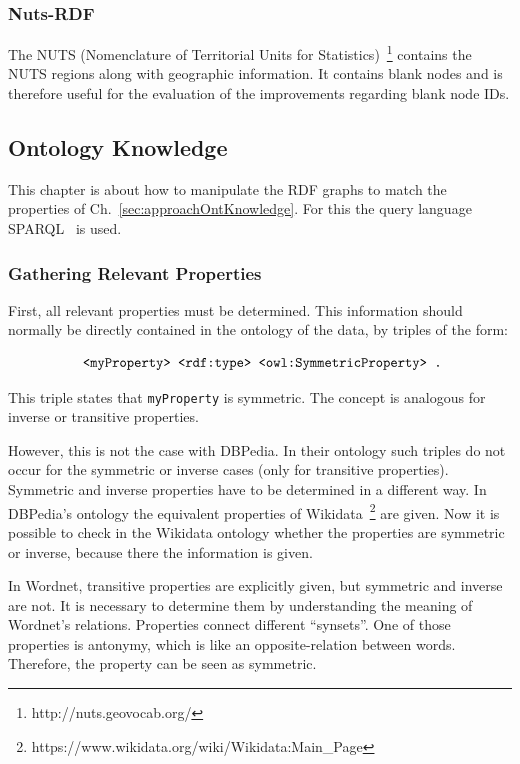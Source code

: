 \subsubsection{Nuts-RDF}

The NUTS (Nomenclature of Territorial Units for Statistics)~\footnote{http://nuts.geovocab.org/} contains the NUTS regions along with geographic information. It contains blank nodes and is therefore useful for the evaluation of the improvements regarding blank node IDs.

\subsection{Ontology Knowledge}\label{sec:implementationOntKnowledge}

This chapter is about how to manipulate the RDF graphs to match the properties of Ch.~\ref{sec:approachOntKnowledge}. For this the query language SPARQL~\cite{sparql} is used.


\subsubsection{Gathering Relevant Properties}
First, all relevant properties must be determined. This information should normally be directly contained in the ontology of the data, by triples of the form:

\[
\text{ {\tt <myProperty> <rdf:type> <owl:SymmetricProperty> .}}
\] 

This triple states that {\tt myProperty} is symmetric. The concept is analogous for inverse or transitive properties. 

However, this is not the case with DBPedia. In their ontology such triples do not occur for the symmetric or inverse cases (only for transitive properties). Symmetric and inverse properties have to be determined in a different way. In DBPedia's ontology the equivalent properties of Wikidata~\footnote{https://www.wikidata.org/wiki/Wikidata:Main\_Page} are given. Now it is possible to check in the Wikidata ontology whether the properties are symmetric or inverse, because there the information is given.

In Wordnet, transitive properties are explicitly given, but symmetric and inverse are not. It is necessary to determine them by understanding the meaning of Wordnet's relations. Properties connect different \enquote{synsets}. One of those properties is antonymy, which is like an opposite-relation between words. Therefore, the property can be seen as symmetric.

